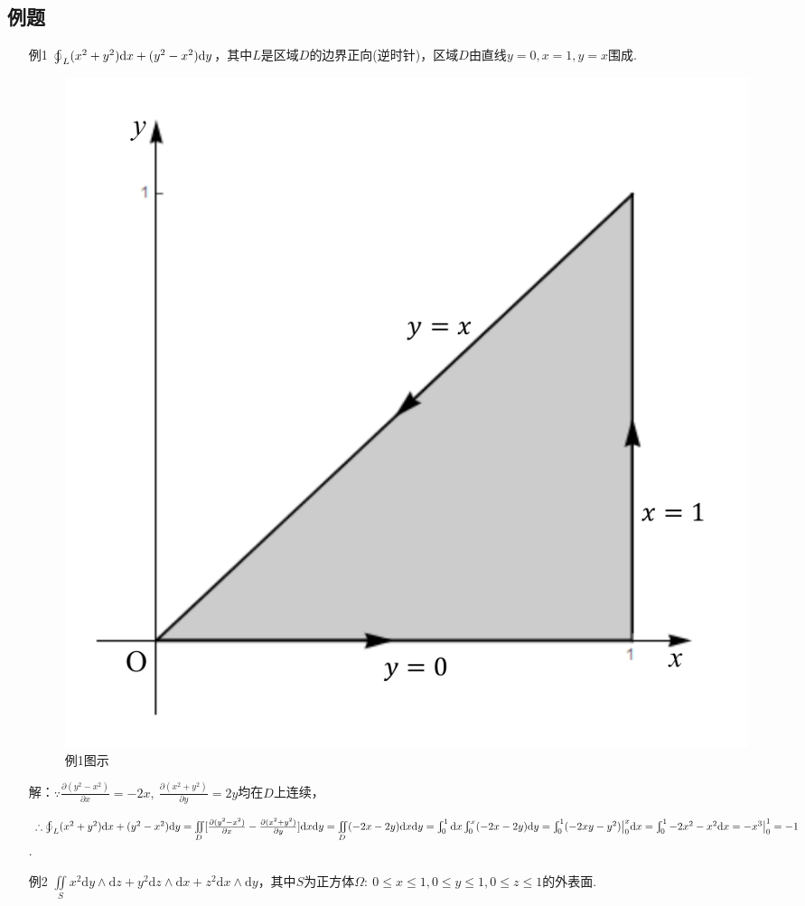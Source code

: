 \documentclass[12pt,UTF8,fleqn]{ctexart}
\newcommand{\Int}[4]{\varint\nolimits_{#1}^{#2}#3\mathrm d#4}
\newcommand{\varIInt}[4]{\iint\limits_{#1}#2\mathrm d#3\mathrm d#4}
\newcommand{\BLOInt}[2]{\varoint\nolimits_{#1}#2}
\newcommand{\md}[1]{\mathrm d#1}
\newcommand{\BSIInt}[2]{\iint\limits_{#1}#2}
\begin{document}
\subsection{例题}
\begin{enumerate}
\item[例1]$\BLOInt L{(x^2+y^2)\md x+(y^2-x^2)\md y}$，其中$L$是区域$D$的边界正向(逆时针)，区域$D$由直线$y=0,x=1,y=x$围成.

\begin{figure}[H]
\begin{center}
\includegraphics[height=0.3\textheight]{Figures20190613/Fig13-3-1-3.pdf}
\end{center}
\caption{例1图示}
\label{13-3-1-3}
\end{figure}

解：$\because\frac{\partial(y^2-x^2)}{\partial x}=-2x,\ \frac{\partial(x^2+y^2)}{\partial y}=2y$均在$D$上连续，

$\therefore\BLOInt L{(x^2+y^2)\md x+(y^2-x^2)\md y}=\varIInt D{[\frac{\partial(y^2-x^2)}{\partial x}-\frac{\partial(x^2+y^2)}{\partial y}]}xy=\varIInt D{(-2x-2y)}xy\\
=\Int01{}x\Int0x{(-2x-2y)}y=\Int01{(-2xy-y^2)\big|_0^x}x=\Int01{-2x^2-x^2}x=-x^3\big|_0^1=-1$.
\item[例2]$\BSIInt S{x^2\md y\wedge\md z+y^2\md z\wedge\md x+z^2\md x\wedge\md y}$，其中$S$为正方体$\Omega:\ 0\leqslant x\leqslant1,0\leqslant y\leqslant1,0\leqslant z\leqslant1$的外表面.


\end{enumerate}
\end{document}
